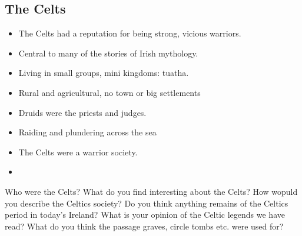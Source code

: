 \documentclass[a4paper]{article}
\begin{document}
\subsection{The Celts}

\begin{itemize}
    \item The Celts had a reputation for being strong, vicious warriors.
    \item Central to many of the stories of Irish mythology.
    \item Living in small groups, mini kingdoms: tuatha.
    \item Rural and agricultural, no town or big settlements
    \item Druids were the priests and judges.
    \item Raiding and plundering across the sea
\end{itemize}


\begin{itemize}
    \item The Celts were a warrior society.
    \item 
\end{itemize}

Who were the Celts? 
What do you find interesting about the Celts?
How wopuld you describe the Celtics society? 
Do you think anything remains of the Celtics period in today's Ireland?
What is your opinion of the Celtic legends we have read?
What do you think the passage graves, circle tombs etc. were used for?
\end{document}
